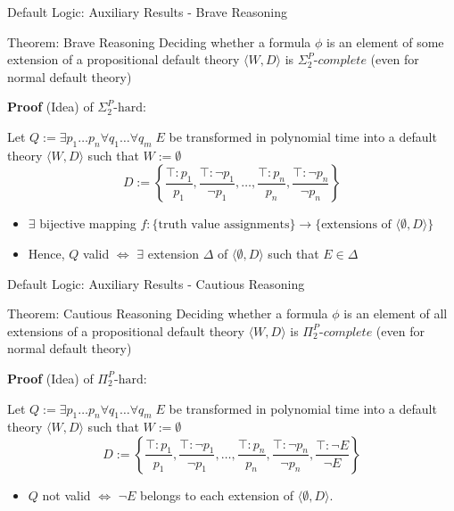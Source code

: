 \documentclass[usenames,dvipsnames, 8pt]{beamer}
\let\lneg\neg
\begin{document}
\begin{frame}{Default Logic: Auxiliary Results - Brave Reasoning}
\begin{block}{Theorem: Brave Reasoning}
Deciding whether a formula $\phi$ is an element of some extension of a propositional default theory $\langle W, D \rangle$ is $\Sigma_2^P\textit{-complete}$ (even for normal default theory)
\end{block}

\textbf{Proof} (Idea) of $\Sigma_2^P\text{-hard}$:

Let $Q:= \exists p_1 \dots p_n \forall q_1 \dots \forall q_m \; E$ be transformed in polynomial time into a default theory $\langle W, D\rangle$ such that $W:=\emptyset$
\begin{equation*}
D:=\left\lbrace \frac{\top:p_1}{p_1},  \frac{\top:\lneg p_1}{\lneg p_1}, \dots, \frac{\top:p_n}{p_n},  \frac{\top:\lneg p_n}{\lneg p_n}\right\rbrace
\end{equation*}
\begin{itemize}[label = {$\bullet$}]
\item $\exists$ bijective mapping $f: \{\text{truth value assignments}\} \to \{\text{extensions of } \langle \emptyset, D \rangle\}$ 
\item Hence, $Q$ valid  $\iff$ $\exists$ extension $\Delta$ of $\langle \emptyset, D\rangle$ such that $E \in \Delta$
\end{itemize}
\end{frame}


\begin{frame}{Default Logic: Auxiliary Results - Cautious Reasoning}
\begin{block}{Theorem: Cautious Reasoning}
Deciding whether a formula $\phi$ is an element of all extensions of a propositional default theory $\langle W, D \rangle$ is $\Pi_2^P\textit{-complete}$ (even for normal default theory)
\end{block}

\textbf{Proof} (Idea) of $\Pi_2^P\text{-hard}$:

Let $Q:= \exists p_1 \dots p_n \forall q_1 \dots \forall q_m \; E$ be transformed in polynomial time into a default theory $\langle W, D\rangle$ such that $W:=\emptyset$
\begin{equation*}
D:=\left\lbrace \frac{\top:p_1}{p_1},  \frac{\top:\lneg p_1}{\lneg p_1}, \dots, \frac{\top:p_n}{p_n},  \frac{\top:\lneg p_n}{\lneg p_n}, \frac{\top:\lneg E}{\lneg E}\right\rbrace
\end{equation*}
\begin{itemize}[label = {$\bullet$}]
\item $Q$ not valid $\iff$ $\lneg E$ belongs to each extension of $\langle \emptyset, D \rangle$.
\end{itemize}
\end{frame}
\end{document}
